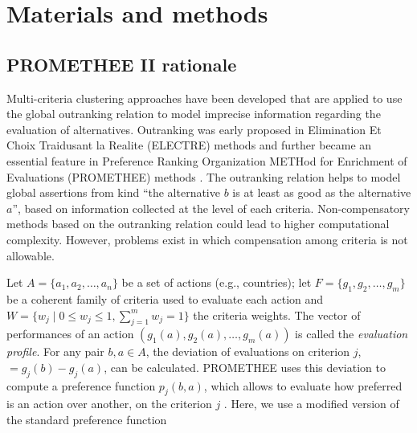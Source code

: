 \documentclass[]{elsarticle}
\theoremstyle{definition}
\begin{document}
%
%
%



\section{Materials and methods}\label{notation}

\subsection{PROMETHEE II rationale}\label{promethee}

Multi-criteria clustering approaches have been developed that are applied to use the global outranking relation to model imprecise information regarding the evaluation of alternatives. Outranking was early proposed in Elimination Et Choix Traidusant la Realite (ELECTRE) methods \citep{figueira2010} and further became an essential feature in  Preference Ranking Organization METHod for Enrichment of Evaluations (PROMETHEE) methods \cite{brans85}. The outranking relation helps to model global  assertions from kind ``the alternative $b$ is at least as good as the alternative $a$'', based on information collected at the level of each criteria. Non-compensatory methods based on the outranking relation could lead to higher computational complexity. However, problems exist in which compensation among criteria is not allowable. 

Let $A=\{a_1,a_2,\ldots,a_n\}$ be a set of actions (e.g., countries);  let $F=\{g_1,g_2,\ldots,g_m\}$ be a coherent family of criteria used to evaluate each action and $W=\{w_j \mid 0 \leq w_j \leq 1, \sum_{j=1}^m w_j =1\}$ the criteria weights.  The vector of performances of an action  $(g_1(a),g_2(a),\ldots,g_m(a))$   is called the \emph{evaluation profile}. 
For any pair  $b,a \in A$, the  deviation of evaluations on criterion $j$, $=g_j(b)-g_j(a)$, can be calculated. PROMETHEE uses this deviation to compute a preference function $p_j(b,a)$, which allows to evaluate how preferred is an action over another, on the criterion $j$ \citep{brans85}.  Here, we use a modified version of the standard preference function
\end{document}

